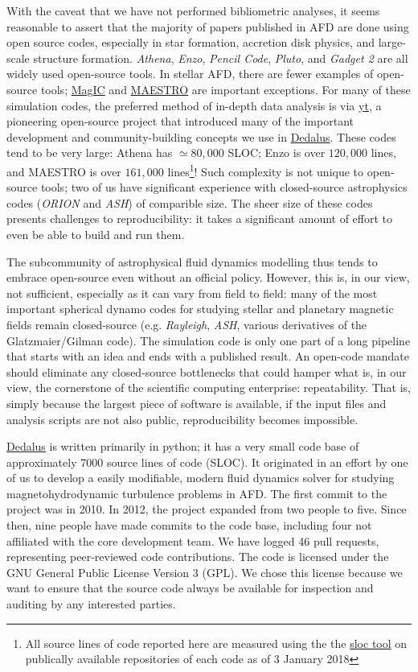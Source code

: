 \documentclass[12pt, titlepage]{aastex62}
\newcommand{\dedalus}{\href{http://dedalus-project.org}{Dedalus}}
\begin{document}
With the caveat that we have not performed bibliometric analyses, it seems reasonable to assert that the majority of papers published in AFD are done using open source codes, especially in star formation, accretion disk physics, and large-scale structure formation. \emph{Athena}, \emph{Enzo}, \emph{Pencil Code}, \emph{Pluto}, and \emph{Gadget 2} are all widely used open-source tools. In stellar AFD, there are fewer examples of open-source tools; \href{http://magic-sph.github.io}{MagIC} and \href{http://amrex-astro.github.io/MAESTRO/}{MAESTRO} are important exceptions. For many of these simulation codes, the preferred method of in-depth data analysis is via \href{http://yt-project.org}{yt}, a pioneering open-source project that introduced many of the important development and community-building concepts we use in \dedalus{}. These codes tend to be very large: Athena has $\simeq 80,000$ SLOC; Enzo is over $120,000$ lines, and MAESTRO is over $161,000$ lines\footnote{All source lines of code reported here are measured using the the \href{https://github.com/bytbox/sloc}{sloc tool} on publically available repositories of each code as of 3 January 2018}! Such complexity is not unique to open-source tools; two of us have significant experience with closed-source astrophysics codes (\emph{ORION} and \emph{ASH}) of comparible size. The sheer size of these codes presents challenges to reproducibility: it takes a significant amount of effort to even be able to build and run them. 

The subcommunity of astrophysical fluid dynamics modelling thus tends to embrace open-source even without an official policy. However, this is, in our view, not sufficient, especially as it can vary from field to field: many of the most important spherical dynamo codes for studying stellar and planetary magnetic fields remain closed-source (e.g. \emph{Rayleigh}, \emph{ASH}, various derivatives of the Glatzmaier/Gilman code). The simulation code is only one part of a long pipeline that starts with an idea and ends with a published result. An open-code mandate should eliminate any closed-source bottlenecks that could hamper what is, in our view, the cornerstone of the scientific computing enterprise: repeatability. That is, simply because the largest piece of software is available, if the input files and analysis scripts are not also public, reproducibility becomes impossible. 

\dedalus{} is written primarily in python; it has a very small code base of approximately 7000 source lines of code (SLOC). It originated in an effort by one of us to develop a easily modifiable, modern fluid dynamics solver for studying magnetohydrodynamic turbulence problems in AFD. The first commit to the project was in 2010. In 2012, the project expanded from two people to five. Since then, nine people have made commits to the code base, including four not affiliated with the core development team. We have logged 46 pull requests, representing peer-reviewed code contributions. The code is licensed under the GNU General Public License Version 3 (GPL). We chose this license because we want to ensure that the source code always be available for inspection and auditing by any interested parties. 
\end{document}
